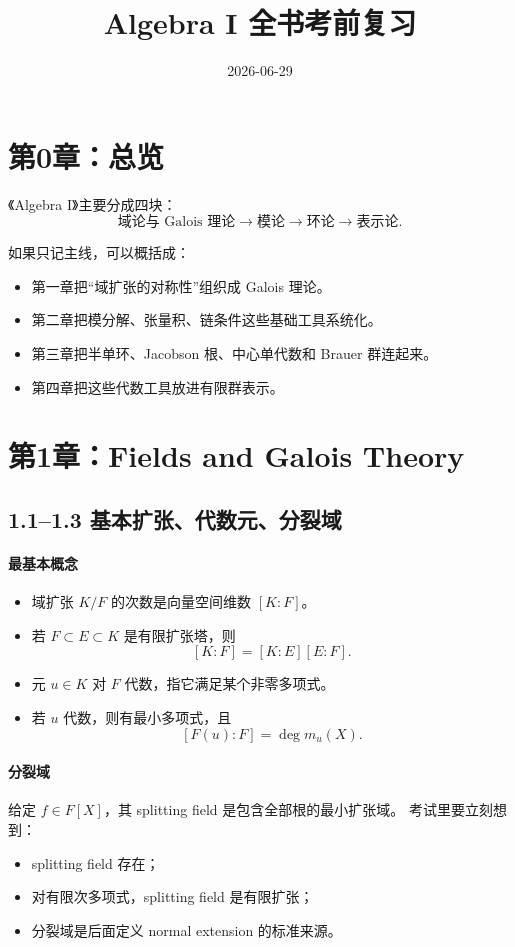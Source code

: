 \documentclass[a4paper]{ctexart}
\title{Algebra I 全书考前复习}
\author{}
\date{2026-06-29}
\begin{document}
\maketitle
\tableofcontents

\section*{第0章：总览}
{}

《Algebra I》主要分成四块：
\[
\text{域论与 Galois 理论}
\to
\text{模论}
\to
\text{环论}
\to
\text{表示论}.
\]

如果只记主线，可以概括成：
\begin{itemize}
  \item 第一章把“域扩张的对称性”组织成 Galois 理论。
  \item 第二章把模分解、张量积、链条件这些基础工具系统化。
  \item 第三章把半单环、Jacobson 根、中心单代数和 Brauer 群连起来。
  \item 第四章把这些代数工具放进有限群表示。
\end{itemize}

\section{第1章：Fields and Galois Theory}

\subsection{1.1--1.3 基本扩张、代数元、分裂域}

\paragraph{最基本概念}
\begin{itemize}
  \item 域扩张 \(K/F\) 的次数是向量空间维数 \([K:F]\)。
  \item 若 \(F\subset E\subset K\) 是有限扩张塔，则
  \[
    [K:F]=[K:E][E:F].
  \]
  \item 元 \(u\in K\) 对 \(F\) 代数，指它满足某个非零多项式。
  \item 若 \(u\) 代数，则有最小多项式，且
  \[
    [F(u):F]=\deg m_u(X).
  \]
\end{itemize}

\paragraph{分裂域}
给定 \(f\in F[X]\)，其 splitting field 是包含全部根的最小扩张域。
考试里要立刻想到：
\begin{itemize}
  \item splitting field 存在；
  \item 对有限次多项式，splitting field 是有限扩张；
  \item 分裂域是后面定义 normal extension 的标准来源。
\end{itemize}
\end{document}
